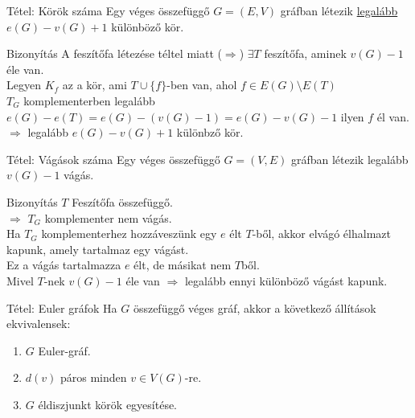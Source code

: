 \documentclass{beamer}
\begin{document}
\begin{frame} 

\begin{block}{Tétel: Körök száma}
Egy véges összefüggő $G = (E, V)$ gráfban létezik \underline{legalább} $e(G) - v(G) + 1$ különböző kör.

\end{block}

\begin{block}{Bizonyítás}
A feszítőfa létezése téltel miatt ($\Rightarrow$) $\exists T$ feszítőfa, aminek $v(G) - 1$ éle van.\\
Legyen $K_f$ az a kör, ami $T \cup \{f\}$-ben van, ahol $f \in E(G) \setminus E(T)$\\
$T_G$ komplementerben legalább $e(G) - e(T) = e(G) - (v(G) - 1) = e(G) - v(G) - 1$ ilyen $f$ él van.\\
$\Rightarrow$ legalább $e(G) - v(G) + 1$ különbző kör.

\end{block}

\end{frame}

\begin{frame}
\begin{block}{Tétel: Vágások száma}
Egy véges összefüggő $G = (V, E)$ gráfban létezik legalább $v(G) - 1$ vágás.
\end{block}

\begin{block}{Bizonyítás}
$T$ Feszítőfa összefüggő.\\
$\Rightarrow$ $T_G$ komplementer nem vágás.\\
Ha $T_G$ komplementerhez hozzáveszünk egy $e$ élt $T$-ből, akkor elvágó élhalmazt kapunk, amely tartalmaz egy vágást.\\
Ez a vágás tartalmazza $e$ élt, de másikat nem $T$ből.\\
Mivel $T$-nek $v(G) - 1$ éle van $\Rightarrow$ legalább ennyi különböző vágást kapunk.

\end{block}

\end{frame}

\begin{frame}

\begin{block}{Tétel: Euler gráfok}
Ha $G$ összefüggő véges gráf, akkor a következő állítások ekvivalensek:\\
\begin{enumerate}
\item $G$ Euler-gráf.
\item $d(v)$ páros minden $v \in V(G)$-re.
\item $G$ éldiszjunkt körök egyesítése.
\end{enumerate}
\end{block}

\end{frame}
\end{document}
